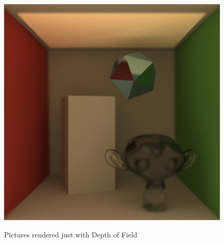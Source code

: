 \documentclass[11pt,a4paper]{article}
\begin{document}
\begin{itemize}
\begin{figure}[H]
\begin{center}
\begin{minipage}[b]{7.5 cm}
\label{fig:3}
\end{minipage}
\begin{minipage}[b]{7.5 cm}
\includegraphics[scale=0.4]{images/DepthOfFieldBack1000spp}
\label{fig:4}
\end{minipage}
\caption[Pictures showing Depth of Field]{Pictures rendered just with Depth of Field}
\end{center}
\end{figure}


\end{itemize}
\end{document}
